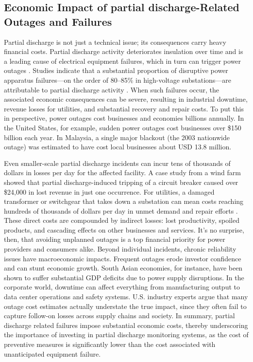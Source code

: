 \subsection{Economic Impact of partial discharge-Related Outages and Failures}

Partial discharge is not just a technical issue; its consequences carry heavy financial costs. Partial discharge activity deteriorates insulation over time and is a leading cause of electrical equipment failures, which in turn can trigger power outages \parencite{Hussain_2021, Agarwal_2023}. Studies indicate that a substantial proportion of disruptive power apparatus failures—on the order of 80--85\% in high-voltage substations—are attributable to partial discharge activity \parencite{Sikorski_2020}. When such failures occur, the associated economic consequences can be severe, resulting in industrial downtime, revenue losses for utilities, and substantial recovery and repair costs. To put this in perspective, power outages cost businesses and economies billions annually. In the United States, for example, sudden power outages cost businesses over \$150 billion each year. In Malaysia, a single major blackout (the 2003 nationwide outage) was estimated to have cost local businesses about USD 13.8 million. 

Even smaller-scale partial discharge incidents can incur tens of thousands of dollars in losses per day for the affected facility. A case study from a wind farm showed that partial discharge-induced tripping of a circuit breaker caused over \$24,000 in lost revenue in just one occurrence. For utilities, a damaged transformer or switchgear that takes down a substation can mean costs reaching hundreds of thousands of dollars per day in unmet demand and repair efforts \parencite{Aslam_2022}. These direct costs are compounded by indirect losses: lost productivity, spoiled products, and cascading effects on other businesses and services. It's no surprise, then, that avoiding unplanned outages is a top financial priority for power providers and consumers alike. Beyond individual incidents, chronic reliability issues have macroeconomic impacts. Frequent outages erode investor confidence and can stunt economic growth. South Asian economies, for instance, have been shown to suffer substantial GDP deficits due to power supply disruptions. In the corporate world, downtime can affect everything from manufacturing output to data center operations and safety systems. U.S. industry experts argue that many outage cost estimates actually understate the true impact, since they often fail to capture follow-on losses across supply chains and society. In summary, partial discharge related failures impose substantial economic costs, thereby underscoring the importance of investing in partial discharge monitoring systems, as the cost of preventive measures is significantly lower than the cost associated with unanticipated equipment failure.


